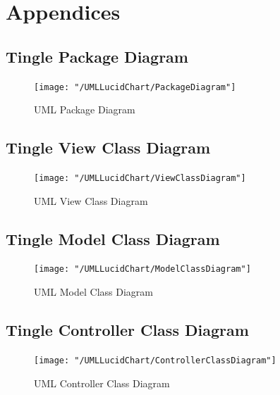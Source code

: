 \documentclass{article} %
\begin{document}

\newpage





 
\appendix
\section{Appendices}
  
  
\subsection{Tingle Package Diagram} \label{App:AppendixA1}

\begin{figure}[h!]
	\centering
	\texttt{[image: "/UMLLucidChart/PackageDiagram"]}
	\caption{UML Package Diagram}
	\label{fig:packagediagram}
\end{figure}

\newpage

\subsection{Tingle View Class Diagram} \label{App:AppendixA2}

\begin{figure}[h!]
	\centering
	\texttt{[image: "/UMLLucidChart/ViewClassDiagram"]}
	\caption{UML View Class Diagram}
	\label{fig:viewclassdiagram}
\end{figure}

\newpage

\subsection{Tingle Model Class Diagram} \label{App:AppendixA3}

\begin{figure}[h!]
	\centering
	\texttt{[image: "/UMLLucidChart/ModelClassDiagram"]}
	\caption{UML Model Class Diagram}
	\label{fig:modelclassdiagram}
\end{figure}

\newpage

\subsection{Tingle Controller Class Diagram} \label{App:AppendixA4}

\begin{figure}[h!]
	\centering
	\texttt{[image: "/UMLLucidChart/ControllerClassDiagram"]}
	\caption{UML Controller Class Diagram}
	\label{fig:controllerclassdiagram}
\end{figure}
\end{document}
